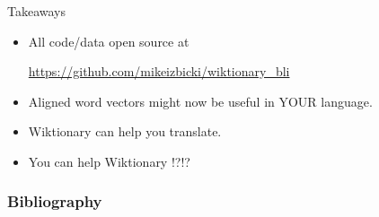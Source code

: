 \documentclass{beamer}
\begin{document}
\begin{frame}{Takeaways}

    \begin{itemize}

        \item
    All code/data open source at

            \begin{center}
    \url{https://github.com/mikeizbicki/wiktionary_bli}
            \end{center}

            \vspace{0.2in}
        \item
            Aligned word vectors might now be useful in YOUR language.

            \vspace{0.2in}
        \item
            Wiktionary can help you translate.

            \vspace{0.2in}
        \item
            You can help Wiktionary !?!?
    \end{itemize}
\end{frame}



\setcounter{finalframe}{\value{framenumber}}
%

\begin{frame}[allowframebreaks]
\frametitle{Bibliography}

%
%

\end{frame}

\setcounter{framenumber}{\value{finalframe}}

\end{document}
